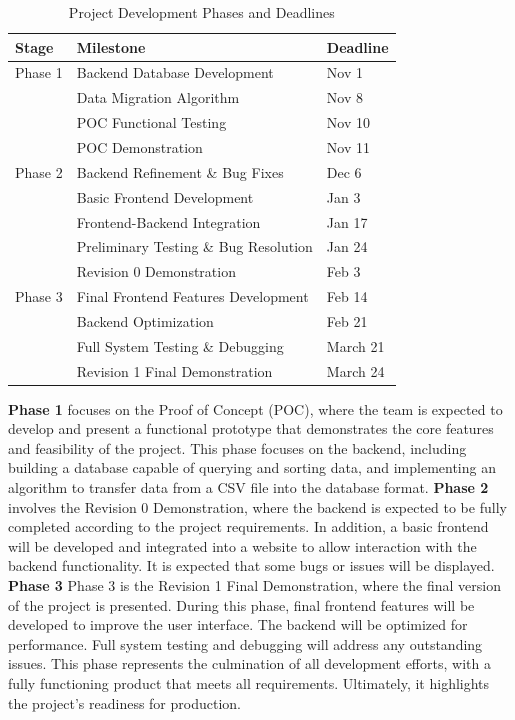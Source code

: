 \documentclass[12pt]{article}
\begin{document}
\begin{table}[H]
  \centering
  \begin{tabular}{|l|l|l|}
  \hline
  \textbf{Stage} & \textbf{Milestone} & \textbf{Deadline} \\
  \hline
  Phase 1 & Backend Database Development & Nov 1 \\
  \texttt{} & Data Migration Algorithm & Nov 8 \\
  \texttt{} & POC Functional Testing & Nov 10 \\
  \texttt{} & POC Demonstration & Nov 11 \\
  \hline
  Phase 2 & Backend Refinement \& Bug Fixes & Dec 6 \\
  \texttt{} & Basic Frontend Development & Jan 3 \\
  \texttt{} & Frontend-Backend Integration & Jan 17 \\
  \texttt{} & Preliminary Testing \& Bug Resolution & Jan 24 \\
  \texttt{} & Revision 0 Demonstration & Feb 3 \\
  \hline
  Phase 3 & Final Frontend Features Development & Feb 14 \\
  \texttt{} & Backend Optimization & Feb 21 \\
  \texttt{} & Full System Testing \& Debugging & March 21 \\
  \texttt{} & Revision 1 Final Demonstration & March 24 \\
  \hline
  \end{tabular}
  \caption{Project Development Phases and Deadlines}
  \label{table:phases}
\end{table}

\noindent\textbf{Phase 1} focuses on the Proof of Concept (POC), where the team
is expected to develop and present a functional prototype that demonstrates the
core features and feasibility of the project. This phase focuses on the backend,
including building a database capable of querying and sorting data, and
implementing an algorithm to transfer data from a CSV file into the database
format.\newline\newline
\noindent\textbf{Phase 2} involves the Revision 0 Demonstration, where the
backend is expected to be fully completed according to the project requirements.
In addition, a basic frontend will be developed and integrated into a website to
allow interaction with the backend functionality. It is expected that some bugs
or issues will be displayed. \newline\newline
\noindent\textbf{Phase 3} Phase 3 is the Revision 1 Final Demonstration, where
the final version of the project is presented. During this phase, final frontend
features will be developed to improve the user interface. The backend will be
optimized for performance. Full system testing and debugging will address any
outstanding issues.  This phase represents the culmination of all development
efforts, with a fully functioning product that meets all requirements.
Ultimately, it highlights the project's readiness for production.
\end{document}
